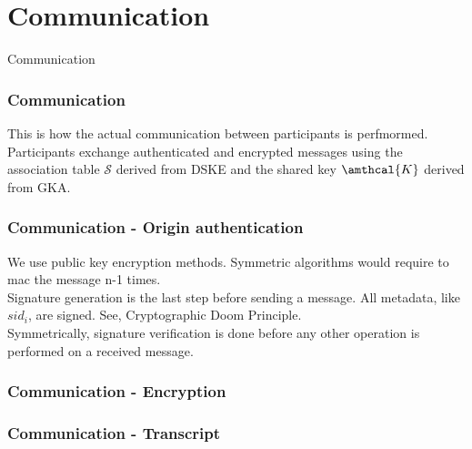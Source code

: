\section{Communication}

\begin{frame}
\Huge{\centerline{Communication}}
\end{frame}

\begin{frame}
  \frametitle{Communication}
  This is how the actual communication between participants is perfmormed.\\[0.3cm]
  
  Participants exchange authenticated and encrypted messages using the association table $\mathcal{S}$ derived from DSKE and the shared key $\amthcal{K}$ derived from GKA.\\[0.3cm]
  
\end{frame}

\begin{frame}
  \frametitle{Communication - Origin authentication}
  We use public key encryption methods. Symmetric algorithms would require to mac the message n-1 times.\\[0.3cm]
  
  Signature generation is the last step before sending a message. All metadata, like $sid_i$, are signed. See, Cryptographic Doom Principle.\\[0.3cm]
  
  Symmetrically, signature verification is done before any other operation is performed on a received message.
\end{frame}

\begin{frame}
  \frametitle{Communication - Encryption}
\end{frame}


\begin{frame}
  \frametitle{Communication - Transcript}
\end{frame}